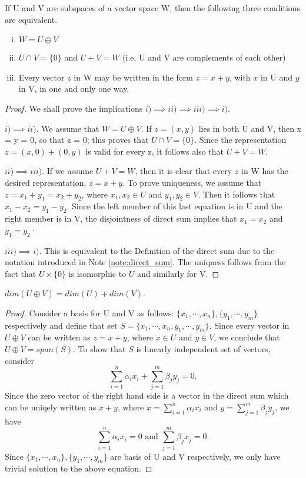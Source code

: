\documentclass[11pt,a4paper]{article}
\begin{document}
\begin{theorem}\label{thm:direct_sum}
    If U and V are subspaces of a vector space W, then the following three conditions are equivalent.
    \begin{enumerate}[i)]
        \item $W = U\oplus V$
        \item $U\cap V = \{0\}$ and $U + V = W$ (i.e, U and V are complements of each other)
        \item Every vector $z$ in W may be written in the form $z = x + y$, with $x$ in U and $y$ in V, in one and only one way.
    \end{enumerate}
\end{theorem}

\begin{proof}
    We shall prove the implications $i)\implies ii)\implies iii)\implies i)$. 
    
    $i)\implies ii)$. We assume that $W = U\oplus V$. If $z = (x, y)$ lies in both U and V, then x = y = 0, so that z = 0; this proves that $U\cap V = \{0\}$. Since the representation $z = (x, 0) + (0, y)$ is valid for every z, it follows also that $U + V = W$.

    $ii)\implies iii)$. If we assume $U + V = W$, then it is clear that every $z$ in W has the desired representation, $z = x + y$. To prove uniqueness, we assume that $z = x_1+y_1 = x_2 +y_2$, where $x_1,x_2\in U$ and $y_1,y_2\in V$. Then it follows that $x_1-x_2=y_1-y_2$. Since the left member of this last equation is in U and the right member is in V, the disjointness of direct sum implies that $x_1 = x_2$ and $y_1=y_2$·

    $iii)\implies i)$. This is equivalent to the Definition of the direct sum due to the notation introduced in Note \ref{note:direct_sum}. The uniqness follows from the fact that $U\times\{0\}$ is isomorphic to $U$ and similarly for V.
\end{proof}

\begin{theorem}\label{thm:dim_direct_sum}
    $dim(U\oplus V) = dim(U)+dim(V)$.
\end{theorem}

\begin{proof}
    Consider a basis for U and V as follows: $\{x_1, \cdots,x_n\}, \{y_1,\cdots,y_m\}$ respectively and define that set $S=\{x_1, \cdots,x_n, y_1,\cdots,y_m\}$. Since every vector in $U\oplus V$ can be written as $z=x+y$, where $x\in U$ and $y\in V$, we conclude that $U\oplus V=span(S)$. To show that $S$ is linearly independent set of vectors, consider 
    $$
        \sum_{i=1}^n\alpha_ix_i +\sum_{j=1}^m\beta_jy_j = 0.
    $$
    Since the zero vector of the right hand side is a vector in the direct sum which can be uniqely written as $x+y$, where $x=\sum_{i=1}^n\alpha_ix_i$ and $y=\sum_{j=1}^m\beta_jy_j$, we have
    $$
    \sum_{i=1}^n\alpha_ix_i = 0\text{ and }\sum_{j=1}^m\beta_jx_j = 0.
    $$
    Since $\{x_1, \cdots,x_n\}, \{y_1,\cdots,y_m\}$ are basis of U and V respectively, we only have trivial solution to the above equation.
\end{proof}
\end{document}
